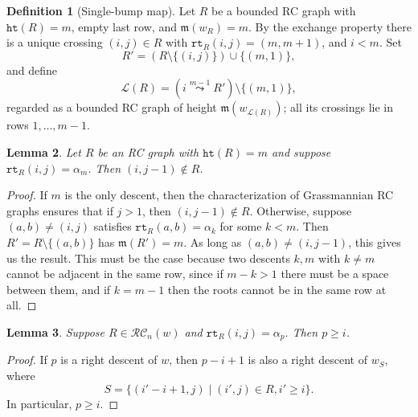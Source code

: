 \documentclass{amsart}
\newtheorem{lemma}{Lemma}[subsection]
\theoremstyle{definition}
\newtheorem{definition}[lemma]{Definition}
\theoremstyle{remark}
\numberwithin{equation}{subsection}
\newcommand{\wof}[1]{w_{#1}}
\newcommand{\rtt}{\mathtt{rt}}
\newcommand{\hr}{\mathtt{ht}}
\newcommand{\RC}{\mathcal{RC}}
\newcommand{\lmap}{\mathscr{L}}
\newcommand{\xleadsto}[2][]{\overset{#2}{\leadsto}}
\newcommand{\ins}[2]{{#2\xleadsto{#1}}}
\newcommand{\maxd}{\mathfrak{m}}
\begin{document}
\begin{definition}[Single-bump map]\label{definition:lmap}
Let $R$ be a bounded RC graph with $\hr(R)=m$, empty last row, and $\maxd(\wof R)=m$. By the exchange property there is a unique crossing $(i,j)\in R$ with $\rtt_R(i,j)=(m,m+1)$, and $i<m$. Set
$$R'=(R\setminus\{(i,j)\})\cup\{(m,1)\},$$
and define
$$\lmap(R)=(\ins{m-1}{i}R')\setminus\{(m,1)\},$$
regarded as a bounded RC graph of height $\maxd(\wof{\lmap(R)})$; all its crossings lie in rows $1,\ldots,m-1$.
\end{definition}


\begin{lemma} \label{lemma:notsimple}
Let $R$ be an RC graph with $\hr(R) = m$ and suppose $\rtt_R(i,j) = \alpha_m$. Then $(i, j - 1)\notin R$.
\end{lemma}
\begin{proof}
  If $m$ is the only descent, then the characterization of Grassmannian RC graphs ensures that if $j>1$, then $(i,j-1)\notin R$. Otherwise, suppose $(a,b)\neq (i,j)$ satisfies $\rtt_R(a,b)=\alpha_k$ for some $k<m$. Then $R' = R\setminus\{(a,b)\}$ has $\maxd(R')=m$. As long as $(a,b)\neq (i, j-1)$, this gives us the result. This must be the case because two descents $k,m$ with $k\neq m$ cannot be adjacent in the same row, since if $m-k>1$ there must be a space between them, and if $k = m-1$ then the roots cannot be in the same row at all.
\end{proof}

\begin{lemma} \label{lemma:simplebound}
Suppose $R\in \RC_n(w)$ and $\rtt_R(i,j) = \alpha_p$. Then $p\geq i$.
\end{lemma}
\begin{proof}
If $p$ is a right descent of $w$, then $p - i + 1$ is also a right descent of $\wof{S}$, where 
  $$S = \{(i' - i + 1, j)\mid (i', j)\in R, i'\geq i\}.$$
  In particular, $p\geq i$. 
\end{proof}
\end{document}
